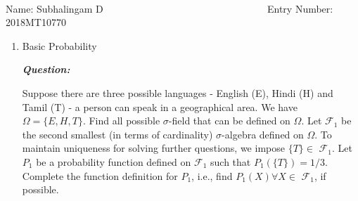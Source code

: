 \documentclass[12pt, oneside]{article}
\begin{document}
\setlength{\textheight}{8.5in}
\\





\vskip 0.5cm

\noindent Name: Subhalingam D~~ ~~~  ~~~~~ ~~~~ ~~~~~~~~~~~~~~~~ Entry Number: 2018MT10770~~~~~~~~~~~



\vskip 0.5cm


\begin{enumerate}



\item Basic Probability

\newcommand{\sfield}[1] {$\mathscr{F}_{#1}$}
\newcommand{\sigmafield}{$\sigma$-field }

\textbf{\textit{Question:}}

Suppose there are three possible languages - English (E), Hindi (H) and Tamil (T) - a person can speak in a geographical area. We have $\Omega = \{E,H,T\}$. Find all possible \sigmafield that can be defined on $\Omega$. 
Let \sfield{1} be the second smallest (in terms of cardinality) $\sigma$-algebra defined on $\Omega$. To maintain uniqueness for solving further questions, we impose $\{T\} \in$ \sfield{1}. Let $P_1$ be a probability function defined on \sfield{1} such that $P_1(\{T\}) = 1/3$. Complete the function definition for $P_1$, i.e., find $P_1(X) \forall X \in $ \sfield{1}, if possible.






\end{enumerate}
\end{document}
